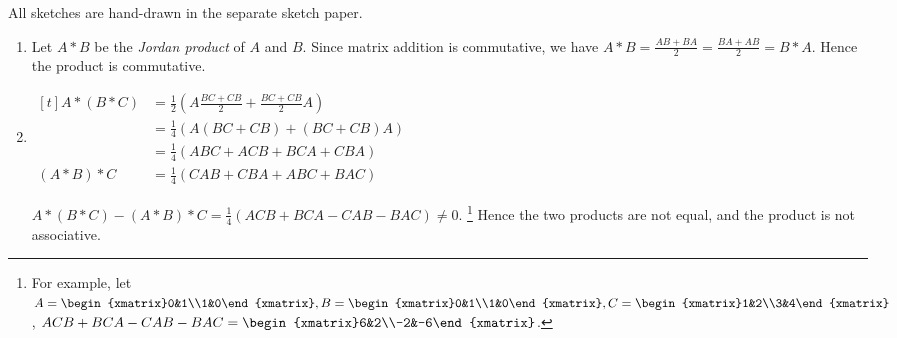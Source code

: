 \begin{exercise}{18}
  All sketches are hand-drawn in the separate sketch paper.
\end{exercise}

\begin{exercise}{19}
  \begin{enumerate}
    \item Let $A * B$ be the \textit{Jordan product} of $A$ and $B$. Since matrix addition is commutative, we have $A * B = \frac{AB + BA}{2} = \frac{BA + AB}{2} = B * A$. Hence the product is commutative. \QED
    \item $\begin{aligned}[t]
        A * (B * C) &= \frac{1}{2}(A\frac{BC + CB}{2} + \frac{BC + CB}{2}A) \\
                            &= \frac{1}{4}(A(BC+CB) + (BC+CB)A) \\
                            &= \frac{1}{4}(ABC+ACB+BCA+CBA) \\
        (A * B) * C &= \frac{1}{4}(CAB+CBA+ABC+BAC)
      \end{aligned}$
      
      $A * (B * C) - (A * B) * C = \frac{1}{4}(ACB+BCA-CAB-BAC) \neq 0$.
      \footnote{For example, let
                $A = \begin{xmatrix}0&1\\1&0\end{xmatrix},
                B = \begin{xmatrix}0&1\\1&0\end{xmatrix},
                C = \begin{xmatrix}1&2\\3&4\end{xmatrix}$,
                $ACB+BCA-CAB-BAC = \begin{xmatrix}6&2\\-2&-6\end{xmatrix}$.}
      Hence the two products are not equal, and the product is not associative. \QED
  \end{enumerate}
\end{exercise}

